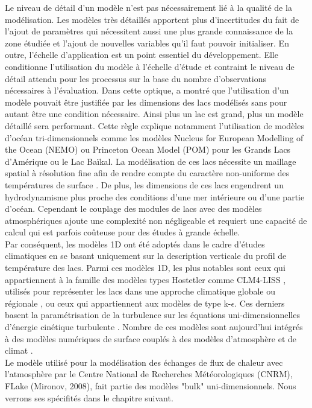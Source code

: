 \noindent Le niveau de détail d’un modèle n’est pas nécessairement lié à la qualité de la modélisation. Les modèles très détaillés apportent plus d’incertitudes du fait de l’ajout de paramètres qui nécessitent aussi une plus grande connaissance de la zone étudiée et l'ajout de nouvelles variables qu'il faut pouvoir initialiser. En outre, l’échelle d’application est un point essentiel du développement. Elle conditionne l’utilisation du modèle à l’échelle d'étude et contraint le niveau de détail attendu pour les processus sur la base du nombre d'observations nécessaires à l'évaluation. Dans cette optique, \citet{swayne2003} a montré que l’utilisation d’un modèle pouvait être justifiée par les dimensions des lacs modélisés sans pour autant être une condition nécessaire. Ainsi plus un lac est grand, plus un modèle détaillé sera performant. Cette règle explique notamment l’utilisation de modèles d’océan tri-dimensionnels comme les modèles Nucleus for European Modelling of the Ocean (NEMO) ou Princeton Ocean Model (POM) pour les Grands Lacs d’Amérique ou le Lac Baïkal. La modélisation de ces lacs nécessite un maillage spatial à résolution fine afin de rendre compte du caractère non-uniforme des températures de surface \citep{leon2007}. De plus, les dimensions de ces lacs engendrent un hydrodynamisme plus proche des conditions d'une mer intérieure ou d'une partie d'océan. Cependant le couplage des modules de lacs avec des modèles atmosphériques ajoute une complexité non négligeable et requiert une capacité de calcul qui est parfois coûteuse pour des études à grande échelle. \\
Par conséquent, les modèles 1D ont été adoptés dans le cadre d’études climatiques en se basant uniquement sur la description verticale du profil de température des lacs. Parmi ces modèles 1D, les plus notables sont ceux qui appartiennent à la famille des modèles types Hostetler \citep{hostetler1993} comme CLM4-LISS \citep{subin2012}, utilisés pour représenter les lacs dans une approche climatique globale ou régionale \citep{martynov2012}, ou ceux qui appartiennent aux modèles de type k-$\epsilon$. Ces derniers basent la paramétrisation de la turbulence sur les équations uni-dimensionnelles d'énergie cinétique turbulente \citep{stepanenko2013}. 
Nombre de ces modèles sont aujourd'hui intégrés à des modèles numériques de surface couplés à des modèles d’atmosphère et de climat \citep{mackay2009, thiery2016, salgado2010, lemoigne2016}.\\

Le modèle utilisé pour la modélisation des échanges de flux de chaleur avec l’atmosphère par le Centre National de Recherches Météorologiques (CNRM), FLake (Mironov, 2008), fait partie des modèles "bulk" uni-dimensionnels. Nous verrons ses spécifités dans le chapitre suivant.

